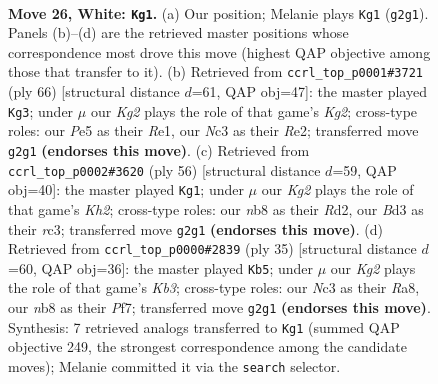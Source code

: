 \documentclass[11pt]{article}
\begin{document}
\clearpage

\begin{figure}[p]\centering
\begin{subfigure}{0.46\textwidth}\centering
\resizebox{\linewidth}{!}{%
\newchessgame
\chessboard[
  setfen={rn6/3bk3/1p2p3/p3Pp2/P5r1/1PNB2P1/5PK1/R2R4 w - - 2 26},
  showmover=false,
  pgfstyle=straightmove, color=movearrow, markmove={g2-g1}
]}
\caption{}
\end{subfigure}\hfill
\begin{subfigure}{0.46\textwidth}\centering
\resizebox{\linewidth}{!}{%
\newchessgame
\chessboard[
  setfen={2b1rk2/1p5p/1r2P1p1/3p1pP1/p2N3P/P2P4/1P2R1K1/4R3 w - - 1 34},
  showmover=false,
  pgfstyle=straightmove, color=movearrow, markmove={g2-g3}
]}
\caption{}
\end{subfigure}
\\[4pt]
\begin{subfigure}{0.46\textwidth}\centering
\resizebox{\linewidth}{!}{%
\newchessgame
\chessboard[
  setfen={3rb1k1/1p3pp1/p3p3/4P2p/1P1N1P1P/PPr5/3R2PK/3R4 w - - 0 29},
  showmover=false,
  pgfstyle=straightmove, color=movearrow, markmove={h2-g1}
]}
\caption{}
\end{subfigure}\hfill
\begin{subfigure}{0.46\textwidth}\centering
\resizebox{\linewidth}{!}{%
\newchessgame
\chessboard[
  setfen={r6r/p4ppp/1k2b3/2p5/R3p3/2P1B1P1/P1K1PP1P/7R b - - 3 18},
  showmover=false,
  pgfstyle=straightmove, color=movearrow, markmove={b6-b5}
]}
\caption{}
\end{subfigure}
\caption{\textbf{Move 26, White: \texttt{Kg1}.} (a) Our position; Melanie plays \texttt{Kg1} (\texttt{g2g1}). Panels (b)--(d) are the retrieved master positions whose correspondence most drove this move (highest QAP objective among those that transfer to it). (b) Retrieved from \texttt{ccrl\_top\_p0001\#3721} (ply 66) [structural distance $d$=61, QAP obj=47]: the master played \texttt{Kg3}; under $\mu$ our \emph{Kg2} plays the role of that game's \emph{Kg2}; cross-type roles: our \emph{P}e5 as their \emph{R}e1, our \emph{N}c3 as their \emph{R}e2; transferred move \texttt{g2g1} \textbf{(endorses this move)}. (c) Retrieved from \texttt{ccrl\_top\_p0002\#3620} (ply 56) [structural distance $d$=59, QAP obj=40]: the master played \texttt{Kg1}; under $\mu$ our \emph{Kg2} plays the role of that game's \emph{Kh2}; cross-type roles: our \emph{n}b8 as their \emph{R}d2, our \emph{B}d3 as their \emph{r}c3; transferred move \texttt{g2g1} \textbf{(endorses this move)}. (d) Retrieved from \texttt{ccrl\_top\_p0000\#2839} (ply 35) [structural distance $d$=60, QAP obj=36]: the master played \texttt{Kb5}; under $\mu$ our \emph{Kg2} plays the role of that game's \emph{Kb3}; cross-type roles: our \emph{N}c3 as their \emph{R}a8, our \emph{n}b8 as their \emph{P}f7; transferred move \texttt{g2g1} \textbf{(endorses this move)}. Synthesis: 7 retrieved analogs transferred to \texttt{Kg1} (summed QAP objective 249, the strongest correspondence among the candidate moves); Melanie committed it via the \texttt{search} selector.}
\label{fig:thought-m50}
\end{figure}
\end{document}
